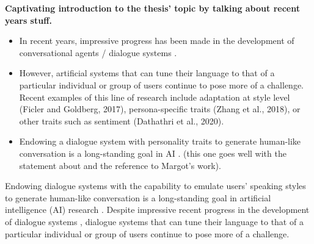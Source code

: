 
\textbf{Captivating introduction to the thesis' topic by talking about recent years stuff.}
\begin{itemize}
    \item In recent years, impressive progress has been made in the development of conversational agents / dialogue systems \citep{mctear2020conversational}.
    \item However, artificial systems that can tune their language to that of a particular individual or group of users continue to pose more of a challenge. Recent examples of this line of research include adaptation at style level (Ficler and Goldberg, 2017), persona-specific traits (Zhang et al., 2018), or other traits such as sentiment (Dathathri et al., 2020).
    \item Endowing a dialogue system with personality traits to generate human-like conversation is a long-standing goal in AI \citep{edlund2008towards, scheutz2011toward}. (this one goes well with the statement about and the reference to Margot's work).
\end{itemize}

Endowing dialogue systems with the capability to emulate users' speaking styles to generate human-like conversation is a long-standing goal in artificial intelligence (AI) research \citep{edlund2008towards, scheutz2011toward}.
Despite impressive recent progress in the development of dialogue systems \citep{mctear2020conversational}, dialogue systems that can tune their language to that of a particular individual or group of users continue to pose more of a challenge.

